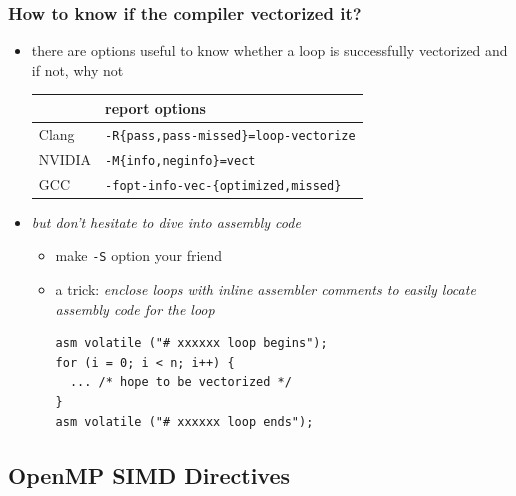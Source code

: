 \documentclass[12pt,dvipdfmx]{beamer}
\newcommand{\ao}[1]{{\color{blue}#1}}
\begin{document}
\begin{frame}[fragile]
\frametitle{How to know if the compiler vectorized it?}
\begin{itemize}

\item there are options useful to know whether a loop is successfully vectorized
  and if not, why not

\begin{center}
{\scriptsize
\begin{tabular}{|l|l|}\hline
& report options \\\hline
Clang 
& {\tt -R\{pass,pass-missed\}=loop-vectorize} \\
NVIDIA
& {\tt -M\{info,neginfo\}=vect} \\
GCC 
& {\tt -fopt-info-vec-\{optimized,missed\}} \\
  \hline
\end{tabular}}
\end{center}

\item \ao{\em but don't hesitate to dive into assembly code}
  \begin{itemize}
  \item make {\tt -S} option your friend
  \item a trick: \ao{\em enclose loops with inline assembler comments to easily locate assembly code for the loop}
\begin{lstlisting}
asm volatile ("# xxxxxx loop begins");
for (i = 0; i < n; i++) {
  ... /* hope to be vectorized */
}
asm volatile ("# xxxxxx loop ends");
\end{lstlisting}
  \end{itemize}
\end{itemize}
\end{frame}

\subsection{OpenMP SIMD Directives}
\end{document}
